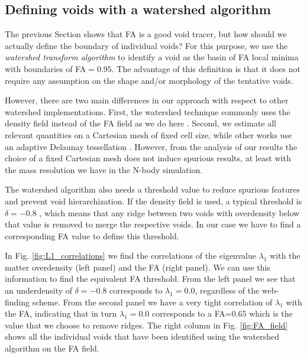 \documentclass[a4,useAMS,usenatbib,usegraphicx]{mn2e}
\begin{document}
   
\subsection{Defining voids with a watershed algorithm}
\label{subsec:watershed}


The previous Section shows that FA is a good void tracer, but how
should we actually define the boundary of individual voids?
For this purpose, we use the \textit{watershed transform algorithm}
\citep{Beucher79,Beucher93} to identify a void as the basin of FA
local minima with boundaries of FA$=0.95$. 
The advantage of this definition is that it does not require any
assumption on the shape and/or morphology of the tentative voids. 

However, there are two main differences in our approach with respect to other
watershed implementations.
First, the watershed technique commonly uses the density field
instead of the FA field as we do here
\citep{Platen07,Neyrinck08}.   
Second, we estimate all relevant quantities on a Cartesian mesh of
fixed cell size, while other works use an adaptive Delaunay tessellation
\citep{Schaap00}.
However, from the analysis of our results the choice of a fixed
Cartesian mesh does not induce spurious results, at least with
the mass resolution we have in the N-body simulation. 

The watershed algorithm also needs a threshold value to reduce
spurious features and prevent void hierarchization.  
If the density field is used, a typical threshold is
$\delta = -0.8$ \citep{Platen07},  which means that any ridge between
two voids with overdensity below that value is removed to merge the
respective voids. 
In our case we have to find a corresponding FA value
to define this threshold. 

In Fig. \ref{fig:L1_correlations} we find the correlations of
the eigenvalue $\lambda_1$ with the matter overdensity (left panel) and
the FA (right panel).
We can use this information to find the equivalent FA threshold. 
From the left panel we see that an underdensity of $\delta=-0.8$ 
corresponds to $\lambda_1=0.0$, regardless of the web-finding
scheme.
From the second panel we have a very tight correlation of $\lambda_1$
with the FA, indicating that in turn $\lambda_1=0.0$ corresponds to a
FA=$0.65$ which is the value that we choose to remove ridges. 
The right column in Fig. \ref{fig:FA_field} shows all the individual
voids that have been identified using the watershed algorithm on the
FA field. 
\end{document}
